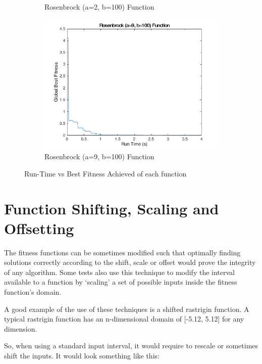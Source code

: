 \begin{figure}
\begin{subfigure}[b]{0.4\textwidth}
    \caption{Rosenbrock (a=2, b=100) Function}
  \end{subfigure}
  \begin{subfigure}[b]{0.4\textwidth}
    \includegraphics[width=\textwidth]{img/summary/rosenbrock9-100}
    \caption{Rosenbrock (a=9, b=100) Function}
  \end{subfigure}
  \caption{Run-Time vs Best Fitness Achieved of each function}
\end{figure}

\clearpage

\section{Function Shifting, Scaling and Offsetting}

\par The fitness functions can be sometimes modified such that optimally finding solutions correctly according to the shift, scale or offset would prove the integrity of any algorithm. Some tests also use this technique to modify the interval available to a function by `scaling' a set of possible inputs inside the fitness function's domain.

\par A good example of the use of these techniques is a shifted rastrigin function. A typical rastrigin function has an n-dimensional domain of [-5.12, 5.12] for any dimension.

\par So, when using a standard input interval, it would require to rescale or sometimes shift the inputs. It would look something like this:


